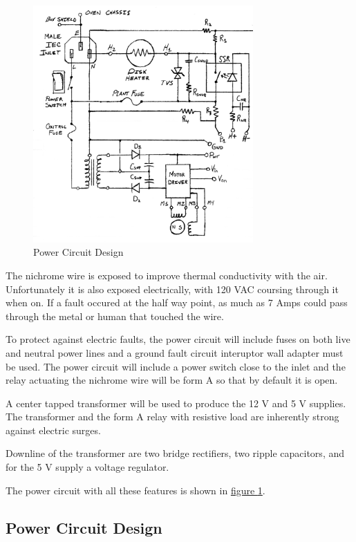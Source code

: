 \documentclass[10pt, twocolumn]{article}
\begin{document}
\begin{figure}
	\centering
	\includegraphics[width=0.75\textwidth]{Figures/power-circuit.pdf}
	\caption{Power Circuit Design}
	\label{power-circuit}
\end{figure}

The nichrome wire is exposed to improve thermal conductivity with the air.
Unfortunately it is also exposed electrically, with 120 VAC coursing through
it when on. If a fault occured at the half way point, as much as 7 Amps could
pass through the metal or human that touched the wire.

To protect against electric faults, the power circuit will include fuses
on both live and neutral power lines and a ground fault circuit interuptor
wall adapter must be used. The power circuit will include a power
switch close to the inlet and the relay actuating the nichrome wire will
be form A so that by default it is open.

A center tapped transformer will be used to produce the 12 V and 5 V supplies.
The transformer and the form A relay with resistive load are
inherently strong against electric surges.

Downline of the transformer are two bridge rectifiers, two ripple capacitors,
and for the 5 V supply a voltage regulator.

The power circuit with all these features is shown in
\hyperref[power-circuit]{figure \ref{power-circuit}}.

\subsection{Power Circuit Design}
\end{document}
